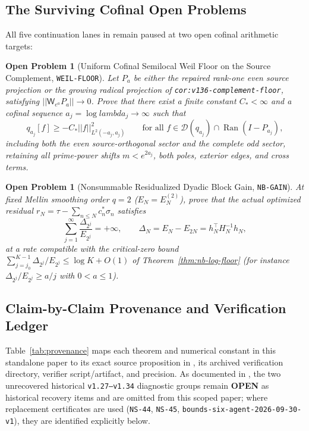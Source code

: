 \documentclass[11pt]{article}
\def\lambda{lambda}%
\def\norm#1{||#1||}%
\newtheorem{openproblem}[theorem]{Open Problem}
\theoremstyle{remark}
\newcommand{\norm}[1]{\left\lVert #1\right\rVert}
\begin{document}
\subsection{The Surviving Cofinal Open Problems}
All five continuation lanes in  remain paused at two open cofinal arithmetic targets:

\begin{openproblem}[Uniform Cofinal Semilocal Weil Floor on the Source Complement, \texttt{WEIL-FLOOR}]
\label{prob:weil-floor}
Let $P_a$ be either the repaired rank-one even source projection or the growing radical projection of \texttt{cor:v136-complement-floor}, satisfying $\norm{\mathsf{W}_{e^a}P_a} \to 0$. Prove that there exist a finite constant $C_* < \infty$ and a cofinal sequence $a_j = \log\lambda_j \to \infty$ such that
\begin{equation}
  q_{a_j}[f] \ge -C_*\norm{f}_{L^2(-a_j,a_j)}^2 \qquad \text{for all } f \in \mathcal{D}(q_{a_j}) \cap \operatorname{Ran}(I - P_{a_j}),
\end{equation}
including both the even source-orthogonal sector and the complete odd sector, retaining all prime-power shifts $m < e^{2a_j}$, both poles, exterior edges, and cross terms.
\end{openproblem}

\begin{openproblem}[Nonsummable Residualized Dyadic Block Gain, \texttt{NB-GAIN}]
\label{prob:nb-gain}
At fixed Mellin smoothing order $q = 2$ ($E_N = E_N^{(2)}$), prove that the actual optimized residual $r_N = \tau - \sum_{n\le N} c_n^*\sigma_n$ satisfies
\begin{equation}
  \sum_{j=1}^\infty \frac{\Delta_{2^j}}{E_{2^j}} = +\infty, \qquad \Delta_N = E_N - E_{2N} = h_N^\top H_N^{-1} h_N,
\end{equation}
at a rate compatible with the critical-zero bound $\sum_{j=j_0}^{K-1} \Delta_{2^j}/E_{2^j} \le \log K + O(1)$ of Theorem~\ref{thm:nb-log-floor} (for instance $\Delta_{2^j}/E_{2^j} \ge a/j$ with $0 < a \le 1$).
\end{openproblem}

\subsection{Claim-by-Claim Provenance and Verification Ledger}
Table~\ref{tab:provenance} maps each theorem and numerical constant in this standalone paper to its exact source proposition in , its archived verification directory, verifier script/artifact, and precision. As documented in , the two unrecovered historical \texttt{v1.27--v1.34} diagnostic groups remain \textbf{OPEN} as historical recovery items and are omitted from this scoped paper; where replacement certificates are used (\texttt{NS-44}, \texttt{NS-45}, \texttt{bounds-six-agent-2026-09-30-v1}), they are identified explicitly below.
\end{document}
